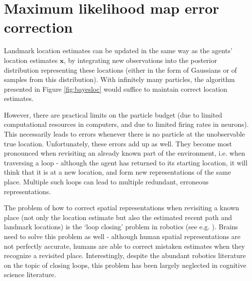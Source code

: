 \clearpage


\section{Maximum likelihood map error correction}

Landmark location estimates can be updated in the same way as the agents' location estimates $\bm x$, by integrating new observations into the posterior distribution representing these locations (either in the form of Gaussians or of samples from this distribution). With infinitely many particles, the algorithm presented in Figure \ref{fig:bayesloc} would suffice to maintain correct location estimates. 

However, there are practical limits on the particle budget (due to limited computational resources in computers, and due to limited firing rates in neurons). This necessarily leads to errors whenever there is no particle at the unobservable true location. Unfortunately, these errors add up as well. They become most pronounced when revisiting an already known part of the environment, i.e. when traversing a loop - although the agent has returned to its starting location, it will think that it is at a new location, and form new representations of the same place. Multiple such loops can lead to multiple redundant, erroneous representations. 

The problem of how to correct spatial representations when revisiting a known place (not only the location estimate but also the estimated recent path and landmark locations) is the `loop closing' problem in robotics (see e.g. \citep{williams2009comparison, thrun2008simultaneous}). Brains need to solve this problem as well - although human spatial representations are not perfectly accurate, humans are able to correct mistaken estimates when they recognize a revisited place. Interestingly, despite the abundant robotics literature on the topic of closing loops, this problem has been largely neglected in cognitive science literature. 

